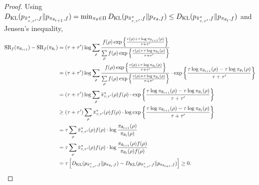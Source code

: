 \begin{proof}
	Using $D_{\mathrm{KL}}(p_{\bar{\pi}_{\tau,\tau^{\prime}}^*, f} \| p_{\pi_{\theta_{t+1}}, f}) = \min_{\pi_\theta \in \Pi}{ D_{\mathrm{KL}}(p_{\bar{\pi}_{\tau,\tau^{\prime}}^*, f}  \| p_{\pi_\theta, f} ) } \le D_{\mathrm{KL}}(p_{\bar{\pi}_{\tau,\tau^{\prime}}^*, f} \| p_{\pi_{\theta_t}, f})$ and Jensen's inequality,
	\begin{equation*}
	\begin{split}
	\text{SR}_f(\pi_{\theta_{t+1}}) - \text{SR}_f(\pi_{\theta_t}) &= (\tau + \tau^{\prime}) \log{ \sum\limits_{\rho}{ \frac{ f(\rho) \exp\left\{ \frac{r(\rho) + \tau \log{\pi_{\theta_{t+1}}(\rho)} }{\tau + \tau^{\prime}} \right\}  }{ \sum\limits_{\rho}{ f(\rho) \exp\left\{ \frac{r(\rho) + \tau \log{\pi_{\theta_t}(\rho)} }{\tau + \tau^{\prime}} \right\} } }  } } \\
	&= (\tau + \tau^{\prime}) \log{ \sum\limits_{\rho}{ \frac{ f(\rho) \exp\left\{ \frac{r(\rho) + \tau \log{\pi_{\theta_t}(\rho)} }{\tau + \tau^{\prime}} \right\}  }{ \sum\limits_{\rho}{ f(\rho) \exp\left\{ \frac{r(\rho) + \tau \log{\pi_{\theta_t}(\rho)} }{\tau + \tau^{\prime}} \right\} } }  } \cdot \exp\left\{ \frac{\tau \log{\pi_{\theta_{t+1}}(\rho)} - \tau \log{\pi_{\theta_t}(\rho)} }{\tau + \tau^{\prime}} \right\} } \\
	&= (\tau + \tau^{\prime}) \log{ \sum\limits_{\rho}{ \bar{\pi}_{\tau,\tau^{\prime}}^*(\rho) f(\rho) } \cdot \exp\left\{ \frac{\tau \log{\pi_{\theta_{t+1}}(\rho)} - \tau \log{\pi_{\theta_t}(\rho)} }{\tau + \tau^{\prime}} \right\} } \\
	&\ge (\tau + \tau^{\prime}) \sum\limits_{\rho}{ \bar{\pi}_{\tau,\tau^{\prime}}^*(\rho) f(\rho) \cdot \log{ \exp\left\{ \frac{\tau \log{\pi_{\theta_{t+1}}(\rho)} - \tau \log{\pi_{\theta_t}(\rho)} }{\tau + \tau^{\prime}} \right\} } } \\
	&= \tau \sum\limits_{\rho}{ \bar{\pi}_{\tau,\tau^{\prime}}^*(\rho) f(\rho) \cdot \log{ \frac{\pi_{\theta_{t+1}}(\rho)}{\pi_{\theta_t}(\rho)} } } \\
	&= \tau \sum\limits_{\rho}{ \bar{\pi}_{\tau,\tau^{\prime}}^*(\rho) f(\rho) \cdot \log{ \frac{ \pi_{\theta_{t+1}}(\rho) f(\rho) }{ \pi_{\theta_t}(\rho) f(\rho)} } } \\
	&= \tau \left[ D_{\mathrm{KL}}(p_{\bar{\pi}_{\tau,\tau^{\prime}}^*, f} \| p_{\pi_{\theta_t}, f}) - D_{\mathrm{KL}}(p_{\bar{\pi}_{\tau,\tau^{\prime}}^*, f} \| p_{\pi_{\theta_{t+1}}, f}) \right] \ge 0. \qedhere
	\end{split}
	\end{equation*}
\end{proof}

